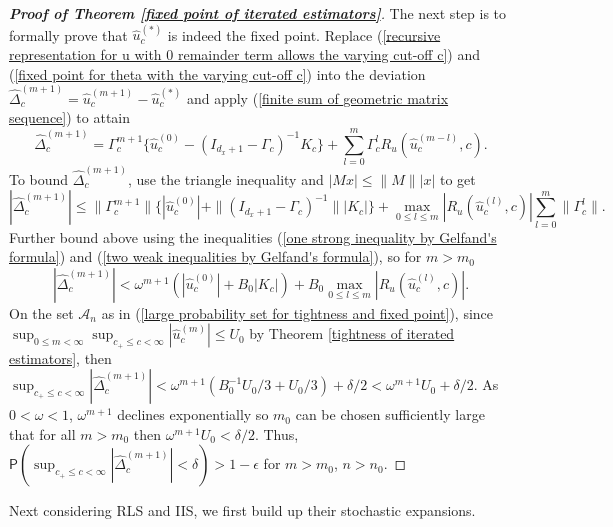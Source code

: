 \documentclass[11pt, letterpaper]{article}
\numberwithin{algorithm}{section}
\numberwithin{assumption}{section}
\numberwithin{lemma}{section}
\numberwithin{theorem}{section}
\numberwithin{corollary}{section}
\numberwithin{remark}{section}
\numberwithin{equation}{section}
\numberwithin{figure}{section}
\numberwithin{table}{section}
\begin{document}
\begin{proof}[\textnormal{\textbf{Proof of Theorem \ref{fixed point of iterated estimators}}}]
The next step is to formally prove that $\widehat{u}_{c}^{(\ast)}$ is indeed the fixed point. Replace (\ref{recursive representation for u with 0 remainder term allows the varying cut-off c}) and (\ref{fixed point for theta with the varying cut-off c}) into the deviation $\widehat{\Delta}_{c}^{(m+1)} = \widehat{u}_{c}^{(m+1)} - \widehat{u}_{c}^{(\ast)}$ and apply (\ref{finite sum of geometric matrix sequence}) to attain
\begin{equation*}
\widehat{\Delta}_{c}^{(m+1)} = \Gamma_{c}^{m+1} \{ \widehat{u}_{c}^{(0)} - (I_{d_{x} + 1} - \Gamma_{c})^{-1}K_{c} \} + \sum_{l=0}^{m} \Gamma_{c}^{l} R_{u}(\widehat{u}_{c}^{(m-l)}, c).
\end{equation*}
To bound $\widehat{\Delta}_{c}^{(m+1)}$, use the triangle inequality and $|M x| \le \| M \| |x|$ to get
\begin{equation*}
|\widehat{\Delta}_{c}^{(m+1)}| \le \| \Gamma_{c}^{m+1} \| \{ |\widehat{u}_{c}^{(0)}| + \| (I_{d_{x} + 1} - \Gamma_{c})^{-1} \| |K_{c}| \} + \max_{0 \le l \le m} |R_{u}(\widehat{u}_{c}^{(l)}, c)| \sum_{l=0}^{m} \| \Gamma_{c}^{l} \|.
\end{equation*}
Further bound above using the inequalities (\ref{one strong inequality by Gelfand's formula}) and (\ref{two weak inequalities by Gelfand's formula}), so for $m > m_{0}$
\begin{equation*}
|\widehat{\Delta}_{c}^{(m+1)}| < \omega^{m+1} ( |\widehat{u}_{c}^{(0)}| + B_{0} |K_{c}| ) + B_{0} \max_{0 \le l \le m} |R_{u}(\widehat{u}_{c}^{(l)}, c)|.
\end{equation*}
On the set $\mathcal{A}_{n}$ as in (\ref{large probability set for tightness and fixed point}), since $\sup_{0 \le m < \infty} \sup_{c_{+} \le c < \infty} |\widehat{u}_{c}^{(m)}| \le U_{0}$ by Theorem \ref{tightness of iterated estimators}, then $\sup_{c_{+} \le c < \infty} |\widehat{\Delta}_{c}^{(m+1)}| < \omega^{m+1}(B_{0}^{-1}U_{0}/3 + U_{0}/3) + \delta / 2 < \omega^{m+1}U_{0} + \delta / 2$. As $0 < \omega < 1$, $\omega^{m+1}$ declines exponentially so $m_{0}$ can be chosen sufficiently large that for all $m > m_{0}$ then $\omega^{m+1}U_{0} < \delta / 2$. Thus, $\mathsf{P} (\sup_{c_{+} \le c < \infty} |\widehat{\Delta}_{c}^{(m+1)}| < \delta) > 1 - \epsilon$ for $m > m_{0}$, $n > n_{0}$.
\end{proof}

Next considering RLS and IIS, we first build up their stochastic expansions.
\end{document}
